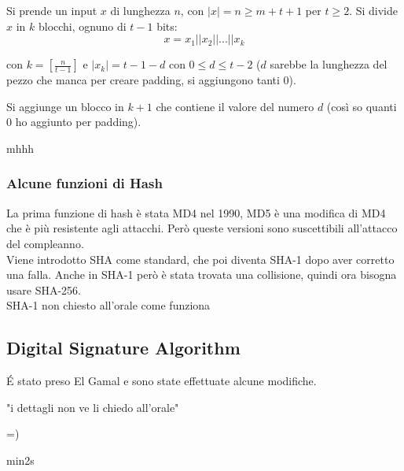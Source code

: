 Si prende un input $x$ di lunghezza $n$, con $|x| = n \geq m + t +1$ per $t \geq 2$. Si divide $x$ in $k$ blocchi, ognuno di $t-1$ bits:
\begin{equation*}
	x = x_1 || x_2 || ... || x_k
\end{equation*}

con $k= [\frac{n}{t-1}]$ e $|x_k| = t - 1 - d$ con $0 \leq d \leq t -2$ ($d$ sarebbe la lunghezza del pezzo che manca per creare padding, si aggiungono tanti 0).

Si aggiunge un blocco in $k+1$ che contiene il valore del numero $d$ (così so quanti 0 ho aggiunto per padding).

mhhh

\subsubsection*{Alcune funzioni di Hash}

La prima funzione di hash è stata MD4 nel 1990, MD5 è una modifica di MD4 che è più resistente agli attacchi. Però queste versioni sono suscettibili all'attacco del compleanno.\\
Viene introdotto SHA come standard, che poi diventa SHA-1 dopo aver corretto una falla.
Anche in SHA-1 però è stata trovata una collisione, quindi ora bisogna usare SHA-256.\\

SHA-1 
non chiesto all'orale come funziona


\subsection*{Digital Signature Algorithm}

\'E stato preso El Gamal e sono state effettuate alcune modifiche.

"i dettagli non ve li chiedo all'orale"

=)

min2s
